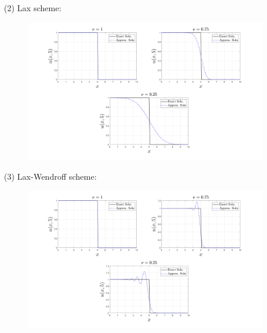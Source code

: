 \documentclass{article}
\begin{document}
\begin{itemize}
\begin{itemize}
        \item[(2)] Lax scheme:
        \newline\newline
        \begin{figure}[H]
            \begin{center}
                \includegraphics[scale = 0.25]{prob_3_lax_subplots.png}
            \end{center}
        \end{figure}

        \item[(3)] Lax-Wendroff scheme:
        \newline\newline
        \begin{figure}[H]
            \begin{center}
                \includegraphics[scale = 0.25]{prob_3_laxwendroff_subplots.png}
            \end{center}
        \end{figure}



\end{itemize}
\end{itemize}
\end{document}
